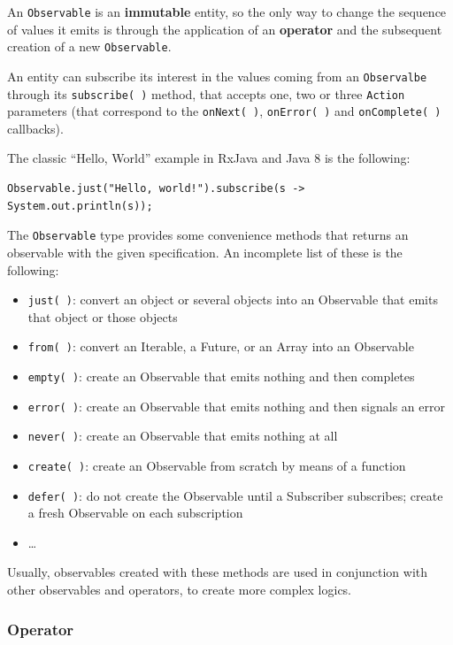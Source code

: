 An \texttt{Observable} is an \textbf{immutable} entity, so the only way
to change the sequence of values it emits is through the application of
an \textbf{operator} and the subsequent creation of a new
\texttt{Observable}.

An entity can subscribe its interest in the values coming from an
\texttt{Observalbe} through its \texttt{subscribe(\ )} method, that
accepts one, two or three \texttt{Action} parameters (that correspond to
the \texttt{onNext(\ )}, \texttt{onError(\ )} and
\texttt{onComplete(\ )} callbacks).

The classic ``Hello, World'' example in RxJava and Java 8 is the
following:

\begin{verbatim}
Observable.just("Hello, world!").subscribe(s -> System.out.println(s));
\end{verbatim}

The \texttt{Observable} type provides some convenience methods that
returns an observable with the given specification. An incomplete list
of these is the following:

\begin{itemize}
\itemsep1pt\parskip0pt
\item
  \texttt{just(\ )}: convert an object or several objects into an
  Observable that emits that object or those objects
\item
  \texttt{from(\ )}: convert an Iterable, a Future, or an Array into an
  Observable
\item
  \texttt{empty(\ )}: create an Observable that emits nothing and then
  completes
\item
  \texttt{error(\ )}: create an Observable that emits nothing and then
  signals an error
\item
  \texttt{never(\ )}: create an Observable that emits nothing at all
\item
  \texttt{create(\ )}: create an Observable from scratch by means of a
  function
\item
  \texttt{defer(\ )}: do not create the Observable until a Subscriber
  subscribes; create a fresh Observable on each subscription
\item
  \ldots{}
\end{itemize}

Usually, observables created with these methods are used in conjunction
with other observables and operators, to create more complex logics.

\subsubsection{Operator}\label{operator}

